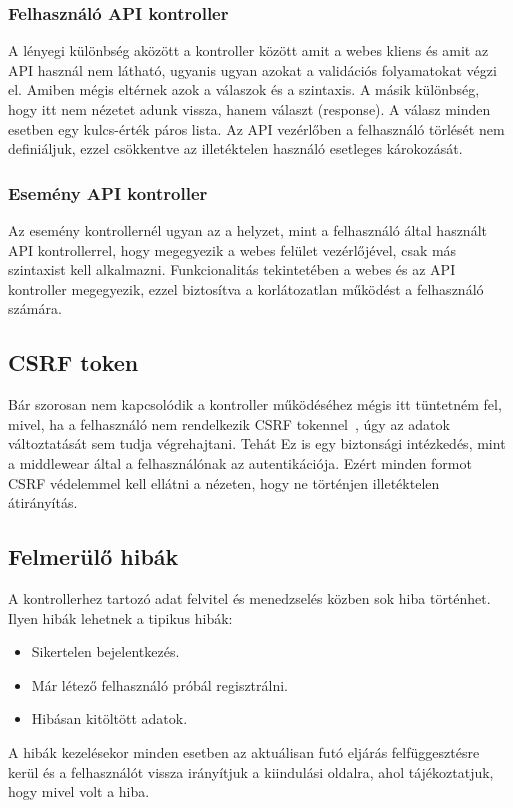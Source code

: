 \documentclass[
]{thesis-ekf}
\theoremstyle{definition}
\theoremstyle{remark}
\begin{document}
	\subsubsection{Felhasználó API kontroller}
	A lényegi különbség aközött a kontroller között amit a webes kliens és amit az API használ nem látható, ugyanis ugyan azokat a validációs folyamatokat végzi el. Amiben mégis eltérnek azok a válaszok és a szintaxis. A másik különbség, hogy itt nem nézetet adunk vissza, hanem választ (response). A válasz minden esetben egy kulcs-érték páros lista.
	Az API vezérlőben a felhasználó törlését nem definiáljuk, ezzel csökkentve az illetéktelen használó esetleges károkozását. 
	
	\subsubsection{Esemény API kontroller}
	Az esemény kontrollernél ugyan az a helyzet, mint a felhasználó által használt API kontrollerrel, hogy megegyezik a webes felület vezérlőjével, csak más szintaxist kell alkalmazni. Funkcionalitás tekintetében a webes és az API kontroller megegyezik, ezzel biztosítva a korlátozatlan működést a felhasználó számára.
	
	\subsection{CSRF token}
	Bár szorosan nem kapcsolódik a kontroller működéséhez mégis itt tüntetném fel, mivel, ha a felhasználó nem rendelkezik CSRF tokennel~\cite{laravel_csrf}, úgy az adatok változtatását sem tudja végrehajtani. Tehát Ez is egy biztonsági intézkedés, mint a middlewear által a felhasználónak az autentikációja. Ezért minden formot CSRF védelemmel kell ellátni a nézeten, hogy ne történjen illetéktelen átirányítás.
	
	\subsection{Felmerülő hibák}
	A kontrollerhez tartozó adat felvitel és menedzselés közben sok hiba történhet. Ilyen hibák lehetnek a tipikus hibák:
	\begin{itemize}
		\item Sikertelen bejelentkezés. 
		\item Már létező felhasználó próbál regisztrálni.
		\item Hibásan kitöltött adatok.
	\end{itemize}
	A hibák kezelésekor minden esetben az aktuálisan futó eljárás felfüggesztésre kerül és a felhasználót vissza irányítjuk a kiindulási oldalra, ahol tájékoztatjuk, hogy mivel volt a hiba. 
	
\end{document}
